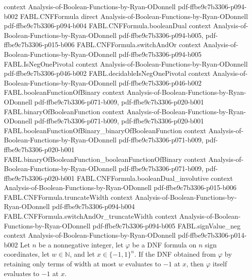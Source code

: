 \begin{theorem}
  {context}
  {Analysis-of-Boolean-Functions-by-Ryan-ODonnell}
  {pdf-ffbe9c7b3306-p094-b002}
\proofstep
  {FABL.CNFFormula}
  {direct}
  {Analysis-of-Boolean-Functions-by-Ryan-ODonnell}
  {pdf-ffbe9c7b3306-p094-b004}
\proofstep
  {FABL.CNFFormula.booleanDual}
  {context}
  {Analysis-of-Boolean-Functions-by-Ryan-ODonnell}
  {pdf-ffbe9c7b3306-p094-b005,
    pdf-ffbe9c7b3306-p015-b006}
\proofstep
  {FABL.CNFFormula.switchAndOr}
  {context}
  {Analysis-of-Boolean-Functions-by-Ryan-ODonnell}
  {pdf-ffbe9c7b3306-p094-b005}
\proofstep
  {FABL.IsNegOnePivotal}
  {context}
  {Analysis-of-Boolean-Functions-by-Ryan-ODonnell}
  {pdf-ffbe9c7b3306-p046-b002}
\proofstep
  {FABL.decidableIsNegOnePivotal}
  {context}
  {Analysis-of-Boolean-Functions-by-Ryan-ODonnell}
  {pdf-ffbe9c7b3306-p046-b002}
\proofstep
  {FABL.booleanFunctionOfBinary}
  {context}
  {Analysis-of-Boolean-Functions-by-Ryan-ODonnell}
  {pdf-ffbe9c7b3306-p071-b009,
    pdf-ffbe9c7b3306-p020-b001}
\proofstep
  {FABL.binaryOfBooleanFunction}
  {context}
  {Analysis-of-Boolean-Functions-by-Ryan-ODonnell}
  {pdf-ffbe9c7b3306-p071-b009,
    pdf-ffbe9c7b3306-p020-b001}
\proofstep
  {FABL.booleanFunctionOfBinary_binaryOfBooleanFunction}
  {context}
  {Analysis-of-Boolean-Functions-by-Ryan-ODonnell}
  {pdf-ffbe9c7b3306-p071-b009,
    pdf-ffbe9c7b3306-p020-b001}
\proofstep
  {FABL.binaryOfBooleanFunction_booleanFunctionOfBinary}
  {context}
  {Analysis-of-Boolean-Functions-by-Ryan-ODonnell}
  {pdf-ffbe9c7b3306-p071-b009,
    pdf-ffbe9c7b3306-p020-b001}
\proofstep
  {FABL.CNFFormula.booleanDual_involutive}
  {context}
  {Analysis-of-Boolean-Functions-by-Ryan-ODonnell}
  {pdf-ffbe9c7b3306-p015-b006}
\proofstep
  {FABL.CNFFormula.truncateWidth}
  {context}
  {Analysis-of-Boolean-Functions-by-Ryan-ODonnell}
  {pdf-ffbe9c7b3306-p094-b004}
\proofstep
  {FABL.CNFFormula.switchAndOr_truncateWidth}
  {context}
  {Analysis-of-Boolean-Functions-by-Ryan-ODonnell}
  {pdf-ffbe9c7b3306-p094-b005}
\proofstep
  {FABL.signValue_neg}
  {context}
  {Analysis-of-Boolean-Functions-by-Ryan-ODonnell}
  {pdf-ffbe9c7b3306-p014-b002}
Let $n$ be a nonnegative integer, let $\varphi$ be a DNF formula on $n$ sign
coordinates, let $w\in\mathbb N$, and let $x\in\{−1,1\}^n$. If the DNF obtained from
$\varphi$ by retaining only terms of width at most $w$ evaluates to $-1$ at $x$, then
$\varphi$ itself evaluates to $-1$ at $x$.
\end{theorem}

